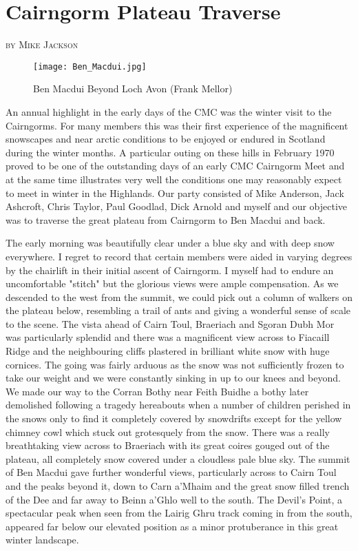 \documentclass[a5paper,openany,font 10pt]{scrbook}
\makeatletter
\newcommand{\chapterauthor}[1]{%
{\parindent0pt\vspace*{-5pt}%
\linespread{1.1}\large\scshape#1%
\par\nobreak\vspace*{35pt}}
\@afterheading%
}
\makeatother
\begin{document}
\chapter{Cairngorm Plateau Traverse}
\label{sec:orgheadline3}
\chapterauthor{by Mike Jackson}

\begin{figure}[htb]
\centering
\texttt{[image: Ben\_Macdui.jpg]}
\caption{\label{fig:orgparagraph4}
Ben Macdui Beyond Loch Avon (Frank Mellor)}
\end{figure}

An annual highlight in the early days of the CMC was the
winter visit to the Cairngorms. For many members this was their
first experience of the magnificent snowscapes and near arctic
conditions to be enjoyed  or endured  in Scotland during the
winter months. A particular outing on these hills in February
1970 proved to be one  of the outstanding days of an early CMC
Cairngorm Meet and at the same time illustrates very well the
conditions one may reasonably expect to meet in winter in the
Highlands. Our party consisted of Mike Anderson, Jack Ashcroft,
Chris Taylor, Paul Goodlad, Dick Arnold and myself and our
objective was to traverse the great plateau from Cairngorm to Ben
Macdui and back.

The early morning was beautifully clear under a blue sky and
with deep snow everywhere. I regret to record that certain
members were aided in varying degrees by the chairlift in their
initial ascent of Cairngorm. I myself had to endure an
uncomfortable "stitch" but the glorious views were ample
compensation. As we descended to the west from the summit, we
could pick out a column of walkers on the plateau below,
resembling a trail of ants and giving a wonderful sense of scale
to the scene. The vista ahead of Cairn Toul, Braeriach and Sgoran
Dubh Mor was particularly splendid and there was a magnificent
view across to Fiacaill Ridge and the neighbouring cliffs
plastered in brilliant white snow with huge cornices. The going
was fairly arduous as the snow was not sufficiently frozen to
take our weight and we were constantly sinking in up to our knees
and beyond. We made our way to the Corran Bothy near Feith Buidhe
 a bothy later demolished following a tragedy hereabouts when a
number of children perished in the snows  only to find it
completely covered by snowdrifts except for the yellow chimney
cowl which stuck out grotesquely from the snow. There was a
really breathtaking view across to Braeriach with its great
coires gouged out of the plateau, all completely snow covered
under a cloudless pale blue sky. The summit of Ben Macdui gave
further wonderful views, particularly across to Cairn Toul and
the peaks beyond it, down to Carn a'Mhaim and the great snow
filled trench of the Dee and far away to Beinn a'Ghlo well to the
south. The Devil's Point, a spectacular peak when seen from the
Lairig Ghru track coming in from the south, appeared far below
our elevated position as a minor protuberance in this great
winter landscape.
\end{document}
